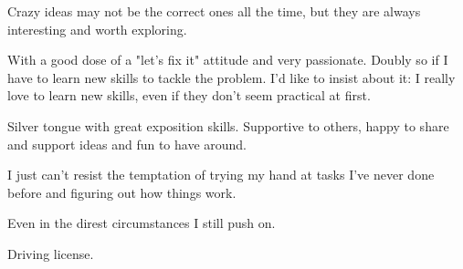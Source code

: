 \documentclass[11pt,a4paper,roman]{moderncv}
\begin{document}
{Crazy ideas may not be the correct ones all the time, but they are always interesting and worth exploring.}

{With a good dose of a "let's fix it" attitude and very passionate. Doubly so if I have to learn new skills to tackle the problem. I'd like to insist about it: I really love to learn new skills, even if they don't seem practical at first.}

{Silver tongue with great exposition skills. Supportive to others, happy to share and support ideas and fun to have around.}

{I just can't resist the temptation of trying my hand at tasks I've never done before and figuring out how things work.}

{Even in the direst circumstances I still push on.}

{Driving license.}


\renewcommand{\listitemsymbol}{-~}            %



%


\end{document}
